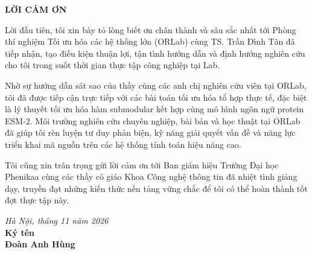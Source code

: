 \thispagestyle{empty}

\begin{center}
    \vspace*{0.2cm}
    {\Large\textbf{LỜI CẢM ƠN}}\par
    \vspace{0.8cm}
\end{center}

Lời đầu tiên, tôi xin bày tỏ lòng biết ơn chân thành và sâu sắc nhất tới Phòng thí nghiệm Tối ưu hóa các hệ thống lớn (ORLab) cùng TS. Trần Đình Tân đã tiếp nhận, tạo điều kiện thuận lợi, tận tình hướng dẫn và định hướng nghiên cứu cho tôi trong suốt thời gian thực tập công nghiệp tại Lab.

Nhờ sự hướng dẫn sát sao của thầy cùng các anh chị nghiên cứu viên tại ORLab, tôi đã được tiếp cận trực tiếp với các bài toán tối ưu hóa tổ hợp thực tế, đặc biệt là lý thuyết tối ưu hóa hàm submodular kết hợp cùng mô hình ngôn ngữ protein ESM-2. Môi trường nghiên cứu chuyên nghiệp, bài bản và học thuật tại ORLab đã giúp tôi rèn luyện tư duy phản biện, kỹ năng giải quyết vấn đề và năng lực triển khai mã nguồn trên các hệ thống tính toán hiệu năng cao.

Tôi cũng xin trân trọng gửi lời cảm ơn tới Ban giám hiệu Trường Đại học Phenikaa cùng các thầy cô giáo Khoa Công nghệ thông tin đã nhiệt tình giảng dạy, truyền đạt những kiến thức nền tảng vững chắc để tôi có thể hoàn thành tốt đợt thực tập này.

\vspace{1.5cm}
\begin{flushright}
    \textit{Hà Nội, tháng 11 năm 2026}\\
    \textbf{Ký tên}\\
    \vspace{2.0cm}
    \textbf{Đoàn Anh Hùng}
\end{flushright}

\clearpage
